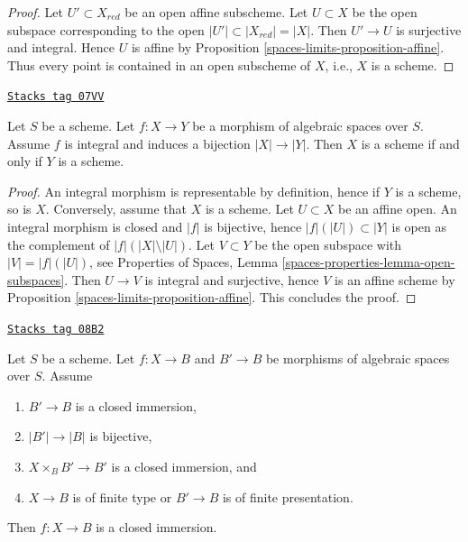 \begin{proof}
Let $U' \subset X_{red}$ be an open affine subscheme.
Let $U \subset X$ be the open subspace corresponding to the open
$|U'| \subset |X_{red}| = |X|$. Then $U' \to U$ is surjective and
integral. Hence $U$ is affine by
Proposition \ref{spaces-limits-proposition-affine}.
Thus every point is contained in an open subscheme of $X$, i.e.,
$X$ is a scheme.
\end{proof}

\begin{lemma}
\label{spaces-limits-lemma-integral-universally-bijective-scheme}
\href{https://stacks.math.columbia.edu/tag/07VV}{\texttt{Stacks tag 07VV}}

Let $S$ be a scheme. Let $f : X \to Y$ be a morphism of algebraic spaces
over $S$. Assume $f$ is integral and induces a bijection $|X| \to |Y|$.
Then $X$ is a scheme if and only if $Y$ is a scheme.
\end{lemma}

\begin{proof}
An integral morphism is representable by definition, hence if $Y$
is a scheme, so is $X$. Conversely, assume that $X$ is a scheme.
Let $U \subset X$ be an affine open. An integral morphism is
closed and $|f|$ is bijective, hence $|f|(|U|) \subset |Y|$
is open as the complement of $|f|(|X| \setminus |U|)$. Let
$V \subset Y$ be the open subspace with $|V| = |f|(|U|)$, see
Properties of Spaces, Lemma \ref{spaces-properties-lemma-open-subspaces}.
Then $U \to V$ is integral and surjective, hence
$V$ is an affine scheme by Proposition \ref{spaces-limits-proposition-affine}.
This concludes the proof.
\end{proof}

\begin{lemma}
\label{spaces-limits-lemma-check-closed-infinitesimally}
\href{https://stacks.math.columbia.edu/tag/08B2}{\texttt{Stacks tag 08B2}}

Let $S$ be a scheme.
Let $f : X \to B$ and $B' \to B$ be morphisms of algebraic spaces over $S$.
Assume
\begin{enumerate}
\item $B' \to B$ is a closed immersion,
\item $|B'| \to |B|$ is bijective,
\item $X \times_B B' \to B'$ is a closed immersion, and
\item $X \to B$ is of finite type or $B' \to B$ is of finite presentation.
\end{enumerate}
Then $f : X \to B$ is a closed immersion.
\end{lemma}

